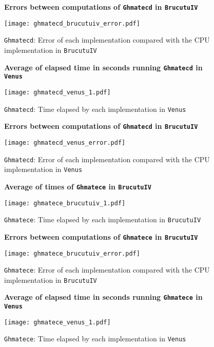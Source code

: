 \begin{figure}[ht]
\centering
\textbf{Errors between computations of \texttt{Ghmatecd} in \texttt{BrucutuIV}}\par\medskip
\texttt{[image: ghmatecd\_brucutuiv\_error.pdf]}
\caption{\texttt{Ghmatecd}: Error of each implementation compared with the CPU implementation in \texttt{BrucutuIV}}
\label{fig:ghmatecd_brucutuiv_error}
\end{figure}

\begin{figure}[ht]
\centering
\textbf{Average of elapsed time in seconds running \texttt{Ghmatecd} in \texttt{Venus}}\par\medskip
\texttt{[image: ghmatecd\_venus\_1.pdf]}
\caption{\texttt{Ghmatecd}: Time elapsed by each implementation in \texttt{Venus}}
\label{fig:ghmatecd_venus_1}
\end{figure}

\begin{figure}[ht]
\centering
\textbf{Errors between computations of \texttt{Ghmatecd} in \texttt{BrucutuIV}}\par\medskip
\texttt{[image: ghmatecd\_venus\_error.pdf]}
\caption{\texttt{Ghmatecd}: Error of each implementation compared with the CPU implementation in \texttt{Venus}}
\label{fig:ghmatecd_venus_error}
\end{figure}

\begin{figure}[ht]
\centering
\textbf{Average of times of \texttt{Ghmatece} in \texttt{BrucutuIV}}\par\medskip
\texttt{[image: ghmatece\_brucutuiv\_1.pdf]}
\caption{\texttt{Ghmatece}: Time elapsed by each implementation in \texttt{BrucutuIV}}
\label{fig:ghmatece_brucutuiv_1}
\end{figure}

\begin{figure}[ht]
\centering
\textbf{Errors between computations of \texttt{Ghmatece} in \texttt{BrucutuIV}}\par\medskip
\texttt{[image: ghmatece\_brucutuiv\_error.pdf]}
\caption{\texttt{Ghmatece}: Error of each implementation compared with the CPU implementation in \texttt{BrucutuIV}}
\label{fig:ghmatece_brucutuiv_error}
\end{figure}

\begin{figure}[ht]
\centering
\textbf{Average of elapsed time in seconds running \texttt{Ghmatece} in \texttt{Venus}}\par\medskip
\texttt{[image: ghmatece\_venus\_1.pdf]}
\caption{\texttt{Ghmatece}: Time elapsed by each implementation in \texttt{Venus}}
\label{fig:ghmatece_venus_1}
\end{figure}

